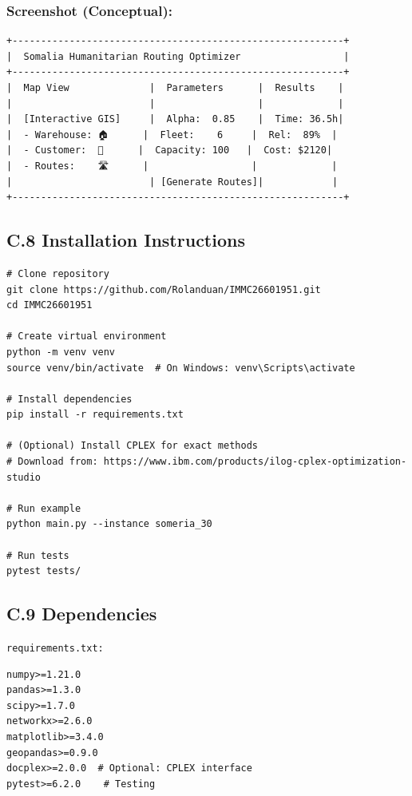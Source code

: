 \subsubsection{Screenshot (Conceptual):}
\begin{verbatim}
+----------------------------------------------------------+
|  Somalia Humanitarian Routing Optimizer                  |
+----------------------------------------------------------+
|  Map View              |  Parameters      |  Results    |
|                        |                  |             |
|  [Interactive GIS]     |  Alpha:  0.85    |  Time: 36.5h|
|  - Warehouse: 🏠      |  Fleet:    6     |  Rel:  89%  |
|  - Customer:  📍      |  Capacity: 100   |  Cost: $2120|
|  - Routes:    🛣️      |                  |             |
|                        | [Generate Routes]|            |
+----------------------------------------------------------+
\end{verbatim}

\subsection{C.8 Installation Instructions}

\begin{verbatim}
# Clone repository
git clone https://github.com/Rolanduan/IMMC26601951.git
cd IMMC26601951

# Create virtual environment
python -m venv venv
source venv/bin/activate  # On Windows: venv\Scripts\activate

# Install dependencies
pip install -r requirements.txt

# (Optional) Install CPLEX for exact methods
# Download from: https://www.ibm.com/products/ilog-cplex-optimization-studio

# Run example
python main.py --instance someria_30

# Run tests
pytest tests/
\end{verbatim}

\subsection{C.9 Dependencies}

\texttt{requirements.txt:}
\begin{verbatim}
numpy>=1.21.0
pandas>=1.3.0
scipy>=1.7.0
networkx>=2.6.0
matplotlib>=3.4.0
geopandas>=0.9.0
docplex>=2.0.0  # Optional: CPLEX interface
pytest>=6.2.0    # Testing
\end{verbatim}

